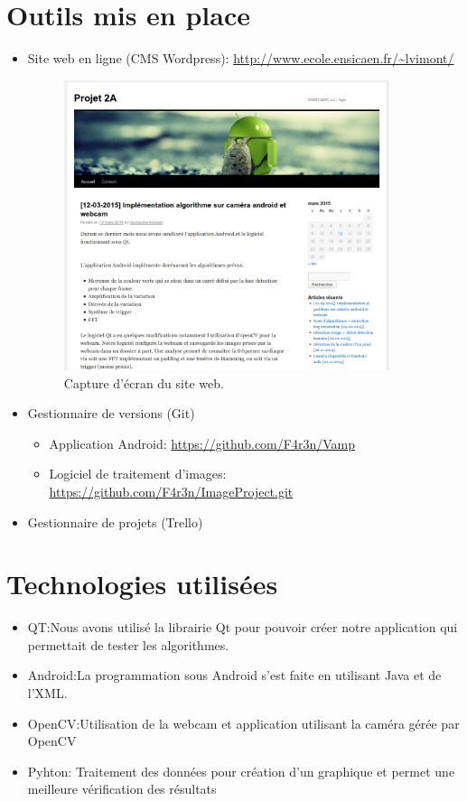 \section{Outils mis en place}

\begin{itemize}
	\item Site web en ligne (CMS Wordpress): \url{http://www.ecole.ensicaen.fr/~lvimont/} 

		\begin{figure}[h!]
			\centering
			\includegraphics[width=0.9\textwidth]{data/website.png}
			\caption{Capture d'écran du site web.}
		\end{figure}

	\item Gestionnaire de versions (Git) 
		\begin{itemize}[label=\textbullet]
			\item Application Android: \url{https://github.com/F4r3n/Vamp} 
			\item Logiciel de traitement d'images: \url{https://github.com/F4r3n/ImageProject.git} 
		\end{itemize}
	\item Gestionnaire de projets (Trello)
\end{itemize}

\section{Technologies utilisées}

\begin{itemize}[label=\textbullet]
	\item QT:Nous avons utilisé la librairie Qt pour pouvoir créer notre application qui permettait de tester les algorithmes.
	\item Android:La programmation sous Android s'est faite en utilisant Java et de l'XML.
	\item OpenCV:Utilisation de la webcam et application utilisant la caméra gérée  par OpenCV
	\item Pyhton: Traitement des données pour création d'un graphique et permet une meilleure vérification des résultats
\end{itemize}

